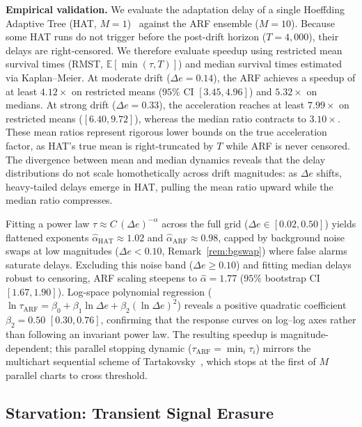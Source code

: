 \documentclass[10pt,conference]{IEEEtran}
\theoremstyle{definition}
\begin{document}
\textbf{Empirical validation.}
We evaluate the adaptation delay of a single Hoeffding Adaptive Tree (HAT, $M = 1$)~\cite{bifet_hat_2009} against the ARF ensemble ($M = 10$).
Because some HAT runs do not trigger before the post-drift horizon ($T = 4{,}000$), their delays are right-censored. We therefore evaluate speedup using restricted mean survival times (RMST, $\mathbb{E}[\min(\tau, T)]$) and median survival times estimated via Kaplan--Meier.
At moderate drift ($\Delta e = 0.14$), the ARF achieves a speedup of at least $4.12\times$ on restricted means ($95\%$ CI $[3.45, 4.96]$) and $5.32\times$ on medians.
At strong drift ($\Delta e = 0.33$), the acceleration reaches at least $7.99\times$ on restricted means ($[6.40, 9.72]$), whereas the median ratio contracts to $3.10\times$.
These mean ratios represent rigorous lower bounds on the true acceleration factor, as HAT's true mean is right-truncated by $T$ while ARF is never censored.
The divergence between mean and median dynamics reveals that the delay distributions do not scale homothetically across drift magnitudes: as $\Delta e$ shifts, heavy-tailed delays emerge in HAT, pulling the mean ratio upward while the median ratio compresses.

Fitting a power law $\tau \approx C\,(\Delta e)^{-\alpha}$ across the full grid ($\Delta e \in [0.02, 0.50]$) yields flattened exponents $\hat\alpha_{\mathrm{HAT}} \approx 1.02$ and $\hat\alpha_{\mathrm{ARF}} \approx 0.98$, capped by background noise swaps at low magnitudes ($\Delta e < 0.10$, Remark~\ref{rem:bgswap}) where false alarms saturate delays.
Excluding this noise band ($\Delta e \ge 0.10$) and fitting median delays robust to censoring, ARF scaling steepens to $\hat\alpha = 1.77$ ($95\%$ bootstrap CI $[1.67, 1.90]$).
Log-space polynomial regression ($\ln \tau_{\mathrm{ARF}} = \beta_0 + \beta_1 \ln \Delta e + \beta_2 (\ln \Delta e)^2$) reveals a positive quadratic coefficient $\beta_2 = 0.50$ $[0.30, 0.76]$, confirming that the response curves on log--log axes rather than following an invariant power law.
The resulting speedup is magnitude-dependent; this parallel stopping dynamic ($\tau_{\mathrm{ARF}} = \min_i \tau_i$) mirrors the multichart sequential scheme of Tartakovsky~\cite{tartakovsky_2005_multichart}, which stops at the first of $M$ parallel charts to cross threshold.

\subsection{Starvation: Transient Signal Erasure}\label{sec:starvation}
\end{document}
